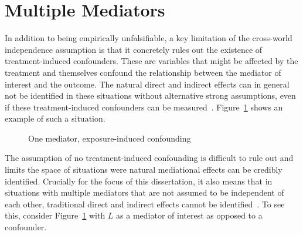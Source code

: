 \section{Multiple Mediators}

In addition to being empirically unfalsifiable, a key limitation of the cross-world independence assumption is that it 
concretely rules out the existence of treatment-induced confounders. 
These are variables that might be affected by the treatment and themselves confound the relationship between the mediator 
of interest and the outcome. The natural direct and indirect effects can in general not be identified in these 
situations without alternative strong assumptions, even if these treatment-induced confounders can be 
measured~\citep{vanderweelevansteelandt2009}. Figure~\ref{fig:exposure_induced_confounder} shows an example of such a 
situation.

\begin{figure}
\centering
{}
\caption[]{One mediator, exposure-induced confounding}
\label{fig:exposure_induced_confounder}
\end{figure}

The assumption of no treatment-induced confounding is difficult to rule out and limits the space of situations
were natural mediational effects can be credibly identified. Crucially for the focus of this dissertation, it also means
that in situations with multiple mediators that are not assumed to be independent of each other,
traditional direct and indirect effects cannot be identified~\citep{avinetal2005,imaiyamamoto2013}. To see this, consider 
Figure~\ref{fig:exposure_induced_confounder} with $L$ as a mediator of interest as opposed to a 
confounder. 

